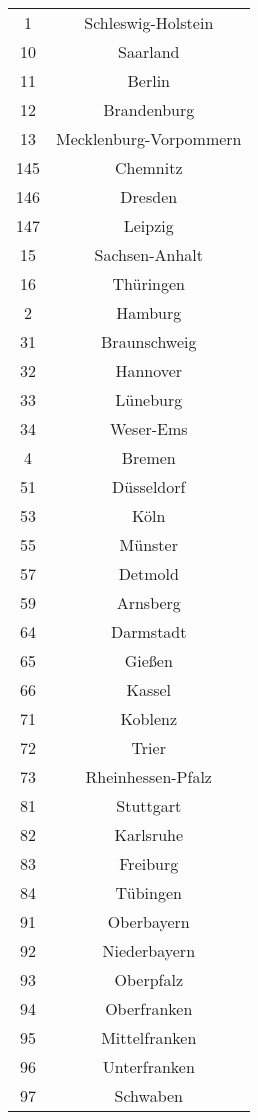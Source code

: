\begin{tabular}{c c}
    1&Schleswig-Holstein\\ 
    10&Saarland\\ 
    11&Berlin\\ 
    12&Brandenburg\\ 
    13&Mecklenburg-Vorpommern\\ 
    145&Chemnitz\\ 
    146&Dresden\\ 
    147&Leipzig\\ 
    15&Sachsen-Anhalt\\ 
    16&Thüringen\\ 
    2&Hamburg\\ 
    31&Braunschweig\\ 
    32&Hannover\\ 
    33&Lüneburg\\ 
    34&Weser-Ems\\ 
    4&Bremen\\ 
    51&Düsseldorf\\ 
    53&Köln\\ 
    55&Münster\\ 
    57&Detmold\\ 
    59&Arnsberg\\ 
    64&Darmstadt\\ 
    65&Gießen\\ 
    66&Kassel\\ 
    71&Koblenz\\ 
    72&Trier\\ 
    73&Rheinhessen-Pfalz\\ 
    81&Stuttgart\\ 
    82&Karlsruhe\\ 
    83&Freiburg\\ 
    84&Tübingen\\ 
    91&Oberbayern\\ 
    92&Niederbayern\\ 
    93&Oberpfalz\\ 
    94&Oberfranken\\ 
    95&Mittelfranken\\ 
    96&Unterfranken\\ 
    97&Schwaben\\ 

\end{tabular}